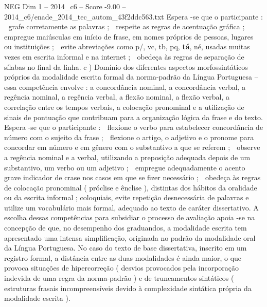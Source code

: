 \begin{textsample}{NEG Dim 1 – 2014\_c6 – Score -9.00 – 2014\_c6/enade\_2014\_tec\_autom\_43f2ddc563.txt}
Espera -se que o participante :  grafe corretamente as palavras ;  respeite as regras de acentuação gráfica ;  empregue maiúsculas em início de frase, em nomes próprios de pessoas, lugares ou instituições ;  evite abreviações como p/, vc, tb, pq, \textbf{tá}, né, usadas muitas vezes em escrita informal e na internet ;  obedeça às regras de separação de sílabas no final da linha. c ) Domínio dos diferentes aspectos morfossintáticos próprios da modalidade escrita formal da norma-padrão da Língua Portuguesa – essa competência envolve : a concordância nominal, a concordância verbal, a regência nominal, a regência verbal, a flexão nominal, a flexão verbal, a correlação entre os tempos verbais, a colocação pronominal e a utilização de sinais de pontuação que contribuam para a organização lógica da frase e do texto.
Espera -se que o participante :  flexione o verbo para estabelecer concordância de número com o sujeito da frase ;  flexione o artigo, o adjetivo e o pronome para concordar em número e em gênero com o substantivo a que se referem ;  observe a regência nominal e a verbal, utilizando a preposição adequada depois de um substantivo, um verbo ou um adjetivo ;  empregue adequadamente o acento grave indicador de crase nos casos em que se fizer necessário ;  obedeça às regras de colocação pronominal ( próclise e ênclise ), distintas dos hábitos da oralidade ou da escrita informal ; coloquiais, evite repetição desnecessária de palavras e utilize um vocabulário mais formal, adequado ao texto de caráter dissertativo.
A escolha dessas competências para subsidiar o processo de avaliação apoia -se na concepção de que, no desempenho dos graduandos, a modalidade escrita tem apresentado uma intensa simplificação, originada no padrão da modalidade oral da Língua Portuguesa.
No caso do texto de base dissertativa, inscrito em um registro formal, a distância entre as duas modalidades é ainda maior, o que provoca situações de hipercorreção ( desvios provocados pela incorporação indevida de uma regra da norma-padrão ) e de truncamentos sintáticos ( estruturas frasais incompreensíveis devido à complexidade sintática própria da modalidade escrita ).

\end{textsample}

